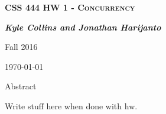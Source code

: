 \documentclass[letterpaper,10pt]{article}
\begin{document}
	
	\begin{titlepage}
		\centering
		{\scshape\LARGE \textbf{CSS 444 HW 1 - Concurrency}\par}
		{\LARGE\itshape \textbf{Kyle Collins and Jonathan Harijanto}\par}
		{\LARGE Fall 2016\par}
		{\LARGE \today\par}
		
		{\LARGE Abstract\par}
		Write stuff here when done with hw. 
		
	\end{titlepage}
	
	\clearpage
	\tableofcontents
	
	
	\clearpage
\end{document}
